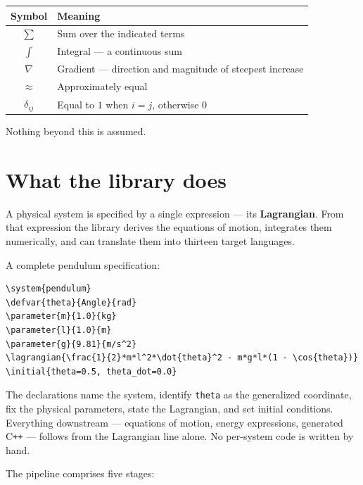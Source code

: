 \documentclass[11pt,a4paper]{article}
\newcommand{\code}[1]{\texttt{#1}}
\begin{document}
\begin{center}
\begin{tabular}{@{}cL{9.6cm}@{}}
\toprule
\textbf{Symbol} & \textbf{Meaning} \\
\midrule
$\sum$        & Sum over the indicated terms \\
$\int$        & Integral --- a continuous sum \\
$\nabla$      & Gradient --- direction and magnitude of steepest increase \\
$\approx$     & Approximately equal \\
$\delta_{ij}$ & Equal to $1$ when $i = j$, otherwise $0$ \\
\bottomrule
\end{tabular}
\end{center}

\noindent Nothing beyond this is assumed.

\section{What the library does}
\label{sec:what}

A physical system is specified by a single expression --- its \textbf{Lagrangian}. From that
expression the library derives the equations of motion, integrates them numerically, and can
translate them into thirteen target languages.

A complete pendulum specification:

\begin{lstlisting}
\system{pendulum}
\defvar{theta}{Angle}{rad}
\parameter{m}{1.0}{kg}
\parameter{l}{1.0}{m}
\parameter{g}{9.81}{m/s^2}
\lagrangian{\frac{1}{2}*m*l^2*\dot{theta}^2 - m*g*l*(1 - \cos{theta})}
\initial{theta=0.5, theta_dot=0.0}
\end{lstlisting}

\noindent The declarations name the system, identify \code{theta} as the generalized coordinate,
fix the physical parameters, state the Lagrangian, and set initial conditions. Everything
downstream --- equations of motion, energy expressions, generated C\texttt{++} --- follows from the
Lagrangian line alone. No per-system code is written by hand.

The pipeline comprises five stages:
\end{document}

